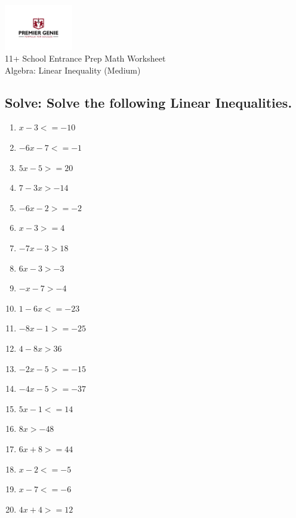 \documentclass{article}
\begin{document}
\begin{center}
\includegraphics[width=3cm]{PREMGENIEJPG.jpg}\\
{\Large 11+ School Entrance Prep Math Worksheet}\\
{\Medium Algebra: Linear Inequality (Medium)}\\

\end{center}

\subsection*{Solve: Solve the following Linear Inequalities.}

\begin{enumerate}
\item $\displaystyle x - 3<=-10 $ \ 
\item $\displaystyle - 6 x - 7<=-1 $ \ 
\item $\displaystyle 5 x - 5>=20 $ \ 
\item $\displaystyle 7 - 3 x>-14 $ \ 
\item $\displaystyle - 6 x - 2>=-2 $ \ 
\item $\displaystyle x - 3>=4 $ \ 
\item $\displaystyle - 7 x - 3>18 $ \ 
\item $\displaystyle 6 x - 3>-3 $ \ 
\item $\displaystyle - x - 7>-4 $ \ 
\item $\displaystyle 1 - 6 x<=-23 $ \ 
\item $\displaystyle - 8 x - 1>=-25 $ \ 
\item $\displaystyle 4 - 8 x>36 $ \ 
\item $\displaystyle - 2 x - 5>=-15 $ \ 
\item $\displaystyle - 4 x - 5>=-37 $ \ 
\item $\displaystyle 5 x - 1<=14 $ \ 
\item $\displaystyle 8 x>-48 $ \ 
\item $\displaystyle 6 x + 8>=44 $ \ 
\item $\displaystyle x - 2<=-5 $ \ 
\item $\displaystyle x - 7<=-6 $ \ 
\item $\displaystyle 4 x + 4>=12 $ \ 


\end{enumerate}
\end{document}
